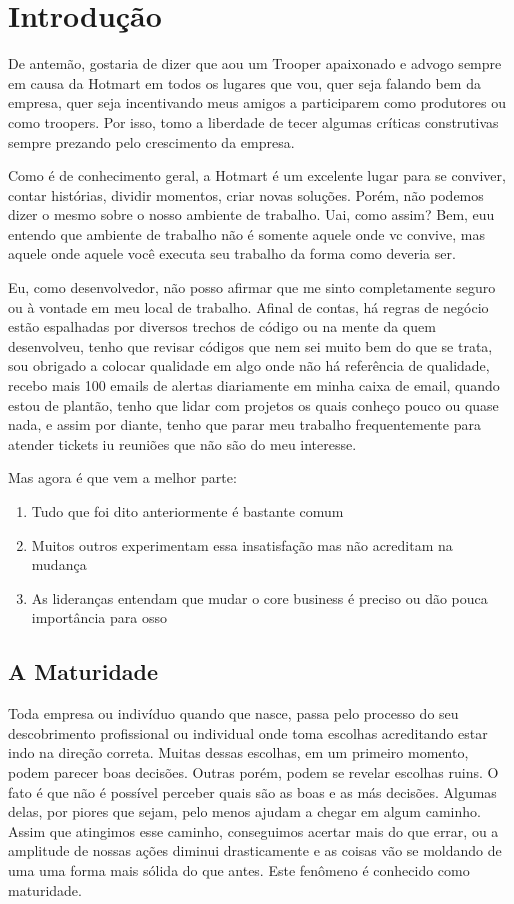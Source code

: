 \chapter{Introdução}

De antemão, gostaria de dizer que aou um Trooper apaixonado e advogo sempre em causa da Hotmart em todos os lugares que vou, quer seja falando bem da empresa, quer seja incentivando meus amigos a participarem como produtores ou como troopers. Por isso, tomo a liberdade de tecer algumas críticas construtivas sempre prezando pelo crescimento da empresa.

Como é de conhecimento geral, a Hotmart é um excelente lugar para se conviver, contar histórias, dividir momentos, criar novas soluções. Porém, não podemos dizer o mesmo sobre o nosso ambiente de trabalho. Uai, como assim? Bem, euu entendo que ambiente de trabalho não é somente aquele onde vc convive, mas aquele onde aquele você executa seu trabalho da forma como deveria ser.

Eu, como desenvolvedor, não posso afirmar que me sinto completamente seguro ou à vontade em meu local de trabalho. Afinal de contas, há regras de negócio estão espalhadas por diversos trechos de código ou na mente da quem desenvolveu, tenho que revisar códigos que nem sei muito bem do que se trata, sou obrigado a colocar qualidade em algo onde não há referência de qualidade, recebo mais 100 emails de alertas diariamente em minha caixa de email, quando estou de plantão, tenho que lidar com projetos os quais conheço pouco ou quase nada, e assim por diante, tenho que parar meu trabalho frequentemente para atender tickets iu reuniões que não são do meu interesse. 

Mas agora é que vem a melhor parte:
\begin{enumerate}
    \item Tudo que foi dito anteriormente é bastante comum
    \item Muitos outros experimentam essa insatisfação mas não acreditam na mudança
    \item As lideranças entendam que mudar o core business é preciso ou dão pouca importância para osso
\end{enumerate}

\section{A Maturidade}

Toda empresa ou indivíduo quando que nasce, passa pelo processo do seu descobrimento profissional ou individual onde toma escolhas acreditando estar indo na direção correta. Muitas dessas escolhas, em um primeiro momento, podem parecer boas decisões. Outras porém, podem se revelar escolhas ruins. O fato é que não é possível perceber quais são as boas e as más decisões. Algumas delas, por piores que sejam, pelo menos ajudam a chegar em algum caminho. Assim que atingimos esse caminho, conseguimos acertar mais do que errar, ou a amplitude de nossas ações diminui drasticamente e as coisas vão se moldando de uma uma forma mais sólida do que antes. Este fenômeno é conhecido como maturidade.


